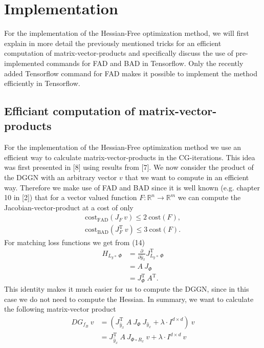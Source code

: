\documentclass[conference]{IEEEtran}
\begin{document}
\section {Implementation}
For the implementation of the Hessian-Free optimization method, we will first explain in more detail the previously mentioned tricks for an efficient computation of matrix-vector-products and specifically discuss the use of pre-implemented commands for FAD and BAD in Tensorflow. Only the recently added Tensorflow command for FAD makes it possible to implement the method efficiently in Tensorflow.


\subsection{Efficiant computation of matrix-vector-products}
For the implementation of the Hessian-Free optimization method we use an efficient way to calculate matrix-vector-products in the CG-iterations. This idea was first presented in [8] using results from [7]. We now consider the product of the DGGN with an arbitrary vector $v$ that we want to compute in an efficient way.
Therefore we make use of FAD and BAD since it is well known (e.g. chapter 10 in [2]) that for a vector valued function $F:\mathbb{R}^{n}\rightarrow\mathbb{R}^{m}$ we can compute the Jacobian-vector-product at a cost of only
\begin{align}
\mathrm{cost}_{\text{FAD}}(J_{F}\:v)\leq 2\:\mathrm{cost}(F),\\
\mathrm{cost}_{\text{BAD}}(J_{F}^{\mathrm{T}}\:v)\leq 3\:\mathrm{cost}(F).
\end{align}
For matching loss functions we get from (14)
\begin{align}
H_{L_{y}\circ\:\Phi} &= \frac{\partial}{\partial \hat{y}_{x}}J_{L_{y}\circ\:\Phi}^{\mathrm{T}} \\
&= A\:J_{\Phi} \\
&= J_{\Phi}^{\mathrm{T}}\:A^{\mathrm{T}}.
\end{align}
This identity makes it much easier for us to compute the DGGN, since in this case we do not need to compute the Hessian. In summary, we want to calculate the following matrix-vector product
\begin{align}
DG_{f_{B}}\:v &=  \left(J_{\hat{y}_{x}}^{\mathrm{T}}\:A\:J_{\Phi}\:J_{\hat{y}_{x}} + \lambda\cdot I^{d\times d}\right)\:v\\
&= J_{\hat{y}_{x}}^{\mathrm{T}}\:A\:J_{\Phi\circ R _{x}}\:v + \lambda\cdot I^{d\times d}\:v
\end{align}
\end{document}

